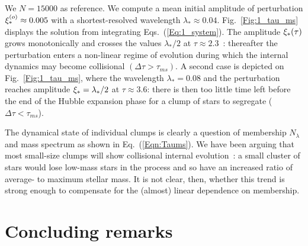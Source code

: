 We $N = 15 000$ as reference.%
We compute a mean initial amplitude of perturbation $\xi_\ast^{(o)} \approx 0.005 $ with a shortest-resolved wavelength $\lambda_\ast \approx 0.04$. Fig.~\ref{Fig:1_tau_ms} displays the solution from integrating Eqs.~(\ref{Eq:1_system}). The amplitude $\xi_\ast(\tau)$ grows monotonically and crosses the values $\lambda_\ast/2$ at $\tau \approx 2.3$~: thereafter the perturbation enters a non-linear regime of evolution during which the internal dynamics may become collisional $( \Delta\tau > \tau_{ms})$. A second case is depicted on Fig.~\ref{Fig:1_tau_ms}, where the wavelength $\lambda_\ast = 0.08$ and the perturbation reaches amplitude $\xi_\ast = \lambda_\ast/2$ at $\tau \approx 3.6$: there is then too little time left before the end of the Hubble expansion phase for a clump of stars to segregate ($\Delta\tau < \tau_{ms}$). 





The dynamical state of individual clumps is clearly a question of membership $N_\lambda$ and mass spectrum as shown in Eq.~(\ref{Eqn:Taums}). We have been arguing that most small-size clumps will show collisional internal evolution~: a small cluster of stars would lose low-mass stars in the process and so have an increased ratio of average-    to maximum stellar mass. It is not clear, then, whether this trend is strong enough to compensate for the (almost) linear dependence on membership. 





\section{Concluding remarks}

